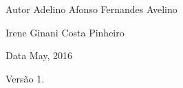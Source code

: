 \begin{DoxyAuthor}{Autor}
Adelino Afonso Fernandes Avelino 

Irene Ginani Costa Pinheiro 
\end{DoxyAuthor}
\begin{DoxyDate}{Data}
May, 2016 
\end{DoxyDate}
\begin{DoxyVersion}{Versão}
1. 
\end{DoxyVersion}
